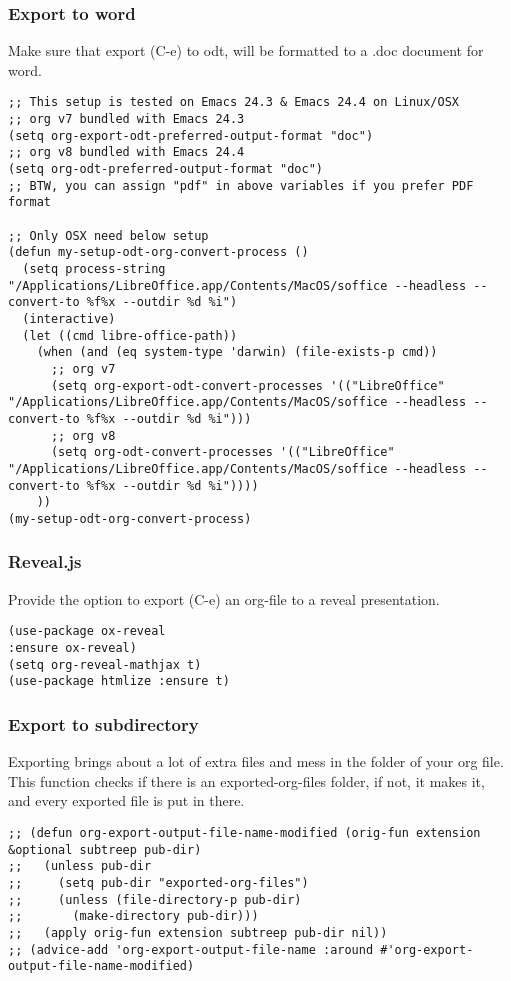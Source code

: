 \documentclass[11pt]{article}
\begin{document}
\subsubsection{Export to word}
\label{sec:orgcd10ac8}
Make sure that export (C-e) to odt, will be formatted to a .doc document for word.
\begin{verbatim}
;; This setup is tested on Emacs 24.3 & Emacs 24.4 on Linux/OSX
;; org v7 bundled with Emacs 24.3
(setq org-export-odt-preferred-output-format "doc")
;; org v8 bundled with Emacs 24.4
(setq org-odt-preferred-output-format "doc")
;; BTW, you can assign "pdf" in above variables if you prefer PDF format

;; Only OSX need below setup
(defun my-setup-odt-org-convert-process ()
  (setq process-string "/Applications/LibreOffice.app/Contents/MacOS/soffice --headless --convert-to %f%x --outdir %d %i")
  (interactive)
  (let ((cmd libre-office-path))
    (when (and (eq system-type 'darwin) (file-exists-p cmd))
      ;; org v7
      (setq org-export-odt-convert-processes '(("LibreOffice" "/Applications/LibreOffice.app/Contents/MacOS/soffice --headless --convert-to %f%x --outdir %d %i")))
      ;; org v8
      (setq org-odt-convert-processes '(("LibreOffice"  "/Applications/LibreOffice.app/Contents/MacOS/soffice --headless --convert-to %f%x --outdir %d %i"))))
    ))
(my-setup-odt-org-convert-process)
\end{verbatim}
\subsubsection{Reveal.js}
\label{sec:org14001b9}
Provide the option to export (C-e) an org-file to a reveal presentation.
\begin{verbatim}
(use-package ox-reveal
:ensure ox-reveal)
(setq org-reveal-mathjax t)
(use-package htmlize :ensure t)
\end{verbatim}
\subsubsection{Export to subdirectory}
\label{sec:org29d0550}
Exporting brings about a lot of extra files and mess in the folder of your org file. This function checks if there is an exported-org-files folder, if not, it makes it, and every exported file is put in there.
\begin{verbatim}
;; (defun org-export-output-file-name-modified (orig-fun extension &optional subtreep pub-dir)
;;   (unless pub-dir
;;     (setq pub-dir "exported-org-files")
;;     (unless (file-directory-p pub-dir)
;;       (make-directory pub-dir)))
;;   (apply orig-fun extension subtreep pub-dir nil))
;; (advice-add 'org-export-output-file-name :around #'org-export-output-file-name-modified)
\end{verbatim}
\end{document}

